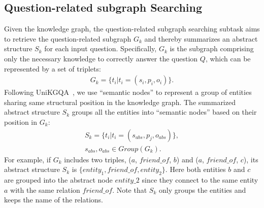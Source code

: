 \documentclass[11pt]{article}
\begin{document}
\subsection{Question-related subgraph Searching}
\label{sec:concept}
Given the knowledge graph, the question-related subgraph searching subtask aims to retrieve the question-related subgraph $G_{k}$ and thereby summarizes an abstract structure $S_k$ for each input question. 
Specifically, $G_{k}$ is the subgraph comprising only the necessary knowledge to correctly answer the question $Q$, which can be represented by a set of triplets:
\begin{equation}
\begin{aligned}
G_{k}=\{t_i|t_i=(s_i,p_i,o_i)\}.
\end{aligned}
\end{equation}
Following UniKGQA~\cite{jiang2022unikgqa}, we use ``semantic nodes'' to represent a group of entities sharing same structural position in the knowledge graph. The summarized abstract structure $S_{k}$ groups all the entities into ``semantic nodes” based on their position in $G_{k}$:
\begin{equation}
\begin{aligned}
S_{k}=\{t_i|t_i=(s_{abs},p_j,o_{abs})\},\\
s_{abs},o_{abs}\in Group(G_k).
\end{aligned}
\end{equation}
For example, if $G_{k}$ includes two triples, ($a$, $friend\_of$, $b$) and ($a$, $friend\_of$, $c$), its abstract structure $S_k$ is $\{entity_1, friend\_of, entity_2\}.$
Here both entities $b$ and $c$ are grouped into the abstract node $entity\_2$ since they connect to the same entity $a$ with the same relation $friend\_of$. Note that $S_k$ only groups the entities and keeps the name of the relations.

\end{document}

